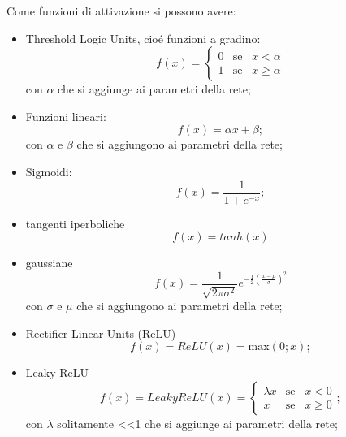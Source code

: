 \documentclass[a4paper,10pt]{article}
\begin{document}
 Come funzioni di attivazione si possono avere:
 \begin{itemize}
  \item Threshold Logic Units, cio\'e funzioni a gradino:
    \begin{equation}
     f(x) = \begin{cases}
             0 & \mbox{se} \;\;\; x<\alpha \\
             1 & \mbox{se} \;\;\; x \ge \alpha
            \end{cases}
    \end{equation}
    con $\alpha$ che si aggiunge ai parametri della rete;

  
  \item Funzioni lineari:
    \begin{equation}
     f(x) = \alpha x + \beta;
    \end{equation}
    con $\alpha$ e $\beta$ che si aggiungono ai parametri della rete;

  
  \item Sigmoidi:
    \begin{equation}
     f(x) = \frac{1}{1+e^{-x}};
    \end{equation}

  
  \item tangenti iperboliche
    \begin{equation}
     f(x) = tanh(x)
    \end{equation}

  
  \item gaussiane
    \begin{equation}
     f(x) = \frac{1}{\sqrt{2 \pi \sigma^2}} e^{-\frac{1}{2}\left(\frac{x-\mu}{\sigma}\right)^2}
    \end{equation}
    con $\sigma$ e $\mu$ che si aggiungono ai parametri della rete;

  
  \item Rectifier Linear Units (ReLU)
    \begin{equation}
     f(x) = ReLU(x) = \mbox{max}(0;x);
    \end{equation}

  
  \item Leaky ReLU
    \begin{equation}
     f(x) = LeakyReLU(x) = \begin{cases}
                            \lambda x & \mbox{se} \;\;\; x<0 \\
                            x & \mbox{se} \;\;\; x \ge 0
                           \end{cases}
;
    \end{equation}
    con $\lambda$ solitamente <<1 che si aggiunge ai parametri della rete;
    
 \end{itemize}
 
\end{document}

